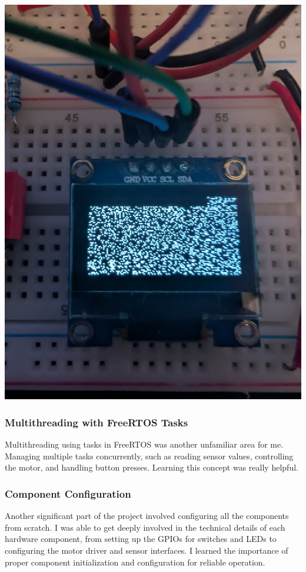 \includegraphics[scale=0.05]{img/oled.jpg}

\subsubsection{Multithreading with FreeRTOS Tasks}
Multithreading using tasks in FreeRTOS was another unfamiliar area for me. Managing multiple tasks concurrently, such as reading sensor values, controlling the motor, and handling button presses. Learning this concept was really helpful.

\subsubsection{Component Configuration}
Another significant part of the project involved configuring all the components from scratch. I was able to get deeply involved in the technical details of each hardware component, from setting up the GPIOs for switches and LEDs to configuring the motor driver and sensor interfaces. I learned the importance of proper component initialization and configuration for reliable operation.

